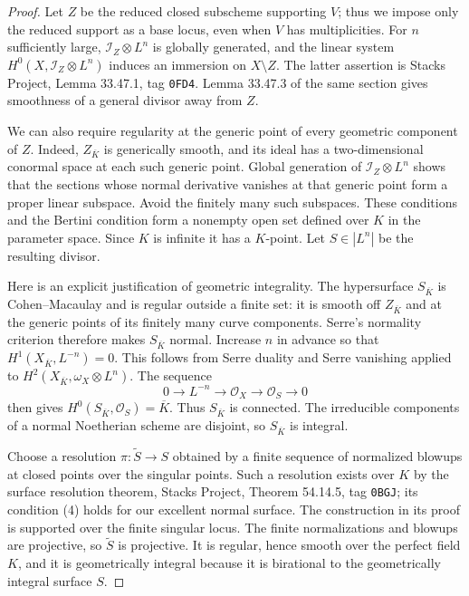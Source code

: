 \begin{proof}
Let $Z$ be the reduced closed subscheme supporting $V$; thus we impose
only the reduced support as a base locus, even when $V$ has
multiplicities.  For $n$ sufficiently large,
$\mathcal I_Z\otimes L^n$ is globally generated, and the linear system
$H^0(X,\mathcal I_Z\otimes L^n)$ induces an immersion on $X\setminus Z$.
The latter assertion is Stacks Project, Lemma 33.47.1, tag
\texttt{0FD4}.  Lemma 33.47.3 of the same section gives smoothness of a
general divisor away from $Z$.

We can also require regularity at the generic point of every geometric
component of $Z$.  Indeed, $Z_{\overline K}$ is generically smooth, and
its ideal has a two-dimensional conormal space at each such generic
point.  Global generation of $\mathcal I_Z\otimes L^n$ shows that the
sections whose normal derivative vanishes at that generic point form
a proper linear subspace.  Avoid the finitely many such subspaces.
These conditions and the Bertini condition form a nonempty open set
defined over $K$ in the parameter space.  Since $K$ is infinite it has
a $K$-point.  Let $S\in|L^n|$ be the resulting divisor.

Here is an explicit justification of geometric integrality.  The
hypersurface $S_{\overline K}$ is Cohen--Macaulay and is regular outside
a finite set: it is smooth off $Z_{\overline K}$ and at the generic
points of its finitely many curve components.  Serre's normality
criterion therefore makes $S_{\overline K}$ normal.  Increase $n$ in
advance so that $H^1(X_{\overline K},L^{-n})=0$.  This follows from
Serre duality and Serre vanishing applied to
$H^2(X_{\overline K},\omega_X\otimes L^n)$.  The sequence
\[
 0\longrightarrow L^{-n}\longrightarrow\mathcal O_X
 \longrightarrow\mathcal O_S\longrightarrow0
\]
then gives $H^0(S_{\overline K},\mathcal O_S)=\overline K$.
Thus $S_{\overline K}$ is connected.  The irreducible components of a
normal Noetherian scheme are disjoint, so $S_{\overline K}$ is integral.

Choose a resolution $\pi:\widetilde S\to S$ obtained by a finite
sequence of normalized blowups at closed points over the singular
points.  Such a resolution exists over $K$ by the surface resolution
theorem, Stacks Project, Theorem 54.14.5, tag \texttt{0BGJ}; its
condition (4) holds for our excellent normal surface.  The
construction in its proof is supported over the finite singular
locus.  The finite normalizations and blowups are projective, so
$\widetilde S$ is projective.  It is regular, hence smooth over the
perfect field $K$, and it is geometrically integral because it is
birational to the geometrically integral surface $S$.


\end{proof}
